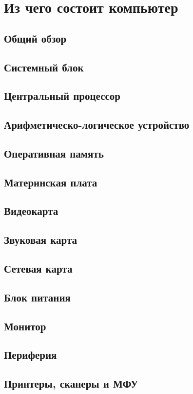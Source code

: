 \section{Из чего состоит компьютер}\label{base:introduction:components}
\subsection{Общий обзор}\label{base:introduction:components:review}
\subsection{Системный блок}\label{base:introduction:components:case}
\subsection{Центральный процессор}\label{base:introduction:componenents:cpu}
\subsection{Арифметическо-логическое устройство}\label{base:introduction:components:alu}
\subsection{Оперативная память}\label{base:introduction:components:ram}
\subsection{Материнская плата}\label{base:introduction:components:motherboard}
\subsection{Видеокарта}\label{base:introduction:components:videocard}
\subsection{Звуковая карта}\label{base:introduction:components:soundcard}
\subsection{Сетевая карта}\label{base:introduction:components:nic}
\subsection{Блок питания}\label{base:introduction:components:psu}
\subsection{Монитор}\label{base:introduction:components:monitor}
\subsection{Периферия}\label{base:introduction:components:peripheral}
\subsection{Принтеры, сканеры и МФУ}\label{base:introduction:components:printers}
